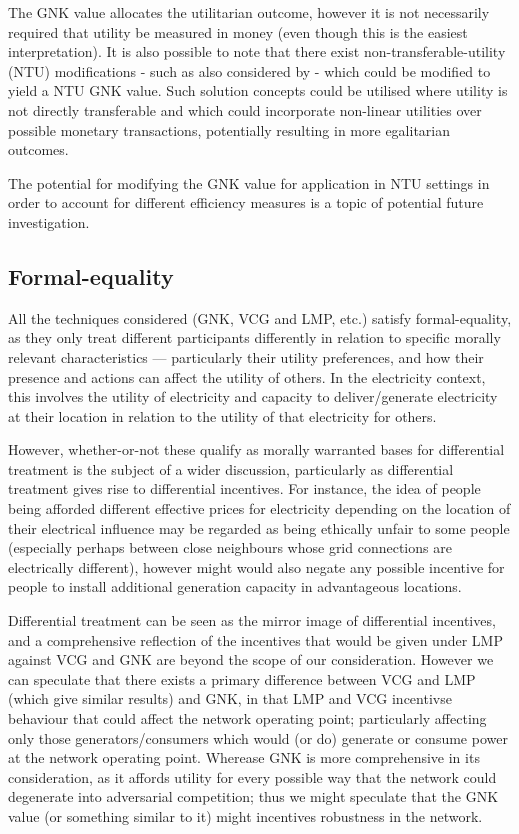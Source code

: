The GNK value allocates the utilitarian outcome, however it is not necessarily required that utility be measured in money (even though this is the easiest interpretation).
It is also possible to note that there exist non-transferable-utility (NTU) modifications - such as also considered by \cite{value1} - which could be modified to yield a NTU GNK value.
Such solution concepts could be utilised where utility is not directly transferable and which could incorporate non-linear utilities over possible monetary transactions, potentially resulting in more egalitarian outcomes.

The potential for modifying the GNK value for application in NTU settings in order to account for different efficiency measures is a topic of potential future investigation.

\subsection{Formal-equality}

All the techniques considered (GNK, VCG and LMP, etc.) satisfy formal-equality, as they only treat different participants differently in relation to specific morally relevant characteristics --- particularly their utility preferences, and how their presence and actions can affect the utility of others.
In the electricity context, this involves the utility of electricity and capacity to deliver/generate electricity at their location in relation to the utility of that electricity for others.

However, whether-or-not these qualify as morally warranted bases for differential treatment is the subject of a wider discussion, particularly as differential treatment gives rise to differential incentives.
For instance, the idea of people being afforded different effective prices for electricity depending on the location of their electrical influence may be regarded as being ethically unfair to some people (especially perhaps between close neighbours whose grid connections are electrically different), however might would also negate any possible incentive for people to install additional generation capacity in advantageous locations.

Differential treatment can be seen as the mirror image of differential incentives, and a comprehensive reflection of the incentives that would be given under LMP against VCG and GNK are beyond the scope of our consideration.
However we can speculate that there exists a primary difference between VCG and LMP (which give similar results) and GNK, in that LMP and VCG incentivse behaviour that could affect the network operating point; particularly affecting only those generators/consumers which would (or do) generate or consume power at the network operating point.
Wherease GNK is more comprehensive in its consideration, as it affords utility for every possible way that the network could degenerate into adversarial competition; thus we might speculate that the GNK value (or something similar to it) might incentives robustness in the network.

